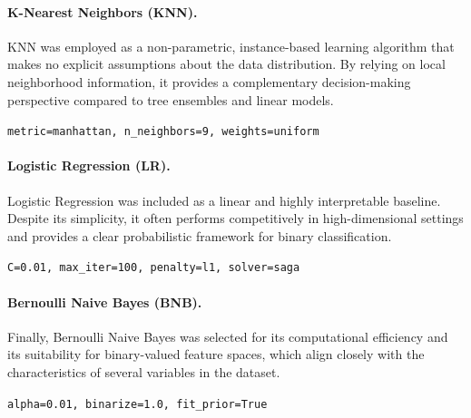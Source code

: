 \paragraph{K-Nearest Neighbors (KNN).}
KNN was employed as a non-parametric, instance-based learning algorithm that makes no explicit assumptions about the data distribution. By relying on local neighborhood information, it provides a complementary decision-making perspective compared to tree ensembles and linear models. 
\begin{tcolorbox}[colback=gray!5!white,colframe=gray!50!black,
                  boxrule=0.5pt,arc=2pt, left=1mm, right=1mm, top=0.5mm, bottom=0.5mm]
\texttt{metric=manhattan, n\_neighbors=9, weights=uniform}
\end{tcolorbox}

\paragraph{Logistic Regression (LR).}
Logistic Regression was included as a linear and highly interpretable baseline. Despite its simplicity, it often performs competitively in high-dimensional settings and provides a clear probabilistic framework for binary classification. 
\begin{tcolorbox}[colback=gray!5!white,colframe=gray!50!black,
                  boxrule=0.5pt,arc=2pt, left=1mm, right=1mm, top=0.5mm, bottom=0.5mm]
\texttt{C=0.01, max\_iter=100, penalty=l1, solver=saga}
\end{tcolorbox}

\paragraph{Bernoulli Naive Bayes (BNB).}
Finally, Bernoulli Naive Bayes was selected for its computational efficiency and its suitability for binary-valued feature spaces, which align closely with the characteristics of several variables in the dataset. 
\begin{tcolorbox}[colback=gray!5!white,colframe=gray!50!black,
                  boxrule=0.5pt,arc=2pt, left=1mm, right=1mm, top=0.5mm, bottom=0.5mm]
\texttt{alpha=0.01, binarize=1.0, fit\_prior=True}
\end{tcolorbox}


